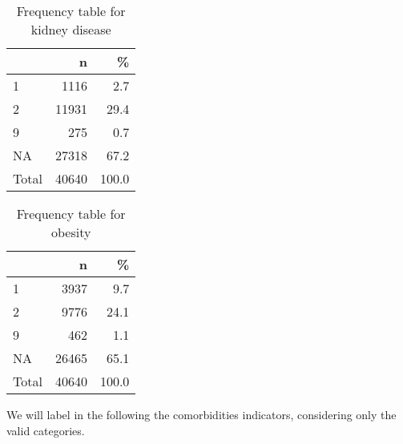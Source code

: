 \documentclass[
]{article}
\newenvironment{Shaded}{\begin{snugshade}}{\end{snugshade}}
\newcommand{\DataTypeTok}[1]{\textcolor[rgb]{0.13,0.29,0.53}{#1}}
\newcommand{\DecValTok}[1]{\textcolor[rgb]{0.00,0.00,0.81}{#1}}
\newcommand{\KeywordTok}[1]{\textcolor[rgb]{0.13,0.29,0.53}{\textbf{#1}}}
\newcommand{\NormalTok}[1]{#1}
\newcommand{\OperatorTok}[1]{\textcolor[rgb]{0.81,0.36,0.00}{\textbf{#1}}}
\newcommand{\OtherTok}[1]{\textcolor[rgb]{0.56,0.35,0.01}{#1}}
\newcommand{\StringTok}[1]{\textcolor[rgb]{0.31,0.60,0.02}{#1}}
\begin{document}
\begin{table}[!h]

\caption{\label{tab:unnamed-chunk-31}Frequency table for kidney disease}
\centering
\begin{tabular}[t]{l|r|r}
\hline
  & n & \%\\
\hline
1 & 1116 & 2.7\\
\hline
2 & 11931 & 29.4\\
\hline
9 & 275 & 0.7\\
\hline
NA & 27318 & 67.2\\
\hline
Total & 40640 & 100.0\\
\hline
\end{tabular}
\end{table}

\begin{Shaded}
\end{Shaded}

\begin{table}[!h]

\caption{\label{tab:unnamed-chunk-32}Frequency table for obesity}
\centering
\begin{tabular}[t]{l|r|r}
\hline
  & n & \%\\
\hline
1 & 3937 & 9.7\\
\hline
2 & 9776 & 24.1\\
\hline
9 & 462 & 1.1\\
\hline
NA & 26465 & 65.1\\
\hline
Total & 40640 & 100.0\\
\hline
\end{tabular}
\end{table}

We will label in the following the comorbidities indicators, considering
only the valid categories.
\end{document}
